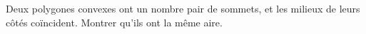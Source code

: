 Deux polygones convexes ont un nombre pair de sommets, et les milieux de leurs côtés coïncident. Montrer qu'ils ont la même aire.
